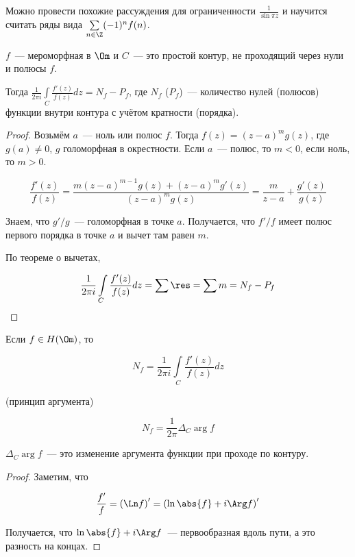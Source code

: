 \begin{observation}
    Можно провести похожие рассуждения для
    ограниченности $\frac{1}{\sin \pi z}$ и научится
    считать ряды вида $\sum\limits_{n\in\Z} (-1)^nf(n)$.
\end{observation}

\begin{theorem}
    $f$~--- мероморфная в $\Om$ и $C$~---
    это простой контур, не проходящий через нули и
    полюсы $f$.

    Тогда
    $\frac{1}{2\pi i}\int\limits_C \frac{f'(z)}{f(z)}dz
        = N_f - P_f$, где $N_f$ ($P_f$)~---
    количество нулей (полюсов) функции внутри контура
    с учётом кратности (порядка).
\end{theorem}

\begin{proof}
    Возьмём $a$~--- ноль или полюс $f$.
    Тогда $f(z) = (z-a)^m g(z)$,
    где $g(a) \ne 0$, $g$ голоморфная в окрестности.
    Если $a$~--- полюс, то $m < 0$, если ноль, то $m > 0$.

    \[
        \frac{f'(z)}{f(z)}
        = \frac{m(z-a)^{m-1} g(z) + (z-a)^mg'(z)}{(z-a)^mg(z)}
        = \frac{m}{z-a} + \frac{g'(z)}{g(z)}
    \]

    Знаем, что $g'/g$~--- голоморфная в точке $a$.
    Получается, что $f'/f$ имеет полюс первого порядка
    в точке $a$ и вычет там равен $m$.

    По теореме о вычетах,

    \[
        \frac{1}{2\pi i}\int\limits_C \frac{f'(z)}{f(z)}dz
        = \sum\res = \sum m = N_f - P_f
    \]
\end{proof}

\begin{consequence}
    Если $f\in H(\Om)$, то

    \[N_f = \frac{1}{2\pi i}\int\limits_C
        \frac{f'(z)}{f(z)}dz\]
\end{consequence}

\begin{consequence}(принцип аргумента)

    \[
        N_f = \frac{1}{2\pi}\Delta_C\arg f
    \]

    $\Delta_C \arg f$~--- это изменение аргумента
    функции при проходе по контуру.
\end{consequence}

\begin{proof}
    Заметим, что

    \[
        \frac{f'}{f} = \left(\Ln f\right)'
        = \left(\ln \abs{f} + i\Arg f\right)'
    \]

    Получается, что $\ln \abs{f} + i\Arg f$~---
    первообразная вдоль пути, а это разность на концах.
\end{proof}

